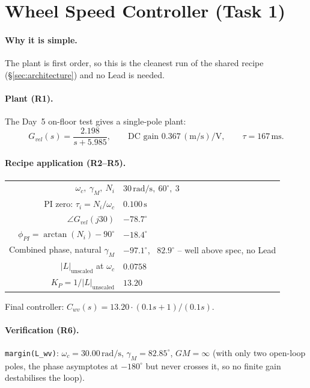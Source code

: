 \section{Wheel Speed Controller (Task 1)}
\label{sec:wheel-speed}

\paragraph{Why it is simple.} The plant is first order, so this is the cleanest run of the shared recipe (§\ref{sec:architecture}) and no Lead is needed.

\paragraph{Plant (R1).} The Day~5 on-floor test gives a single-pole plant:
\[
G_{vel}(s) = \frac{2.198}{s + 5.985}, \qquad
\text{DC gain } 0.367\,\mathrm{(m/s)/V}, \qquad
\tau = 167\,\mathrm{ms}.
\]

\paragraph{Recipe application (R2--R5).}

\begin{center}\small
\begin{tabular}{rl}
$\omega_c,\ \gamma_M,\ N_i$ & $30\,\mathrm{rad/s},\ 60^{\circ},\ 3$ \\
PI zero: $\tau_i = N_i / \omega_c$ & $0.100\,\mathrm{s}$ \\
$\angle G_{vel}(j30)$ & $-78.7^{\circ}$ \\
$\phi_{PI} = \arctan(N_i) - 90^{\circ}$ & $-18.4^{\circ}$ \\
Combined phase, natural $\gamma_M$ & $-97.1^{\circ}$, \ $82.9^{\circ}$ -- well above spec, no Lead \\
$|L|_{\mathrm{unscaled}}$ at $\omega_c$ & $0.0758$ \\
$K_P = 1 / |L|_{\mathrm{unscaled}}$ & $\mathbf{13.20}$ \\
\end{tabular}
\end{center}

\noindent Final controller: $C_{wv}(s) = 13.20 \cdot (0.1s + 1)/(0.1s)$.

\paragraph{Verification (R6).} \texttt{margin(L\_wv)}: $\omega_c = 30.00\,\mathrm{rad/s}$, $\gamma_M = 82.85^{\circ}$, $GM = \infty$ (with only two open-loop poles, the phase asymptotes at $-180^{\circ}$ but never crosses it, so no finite gain destabilises the loop).

